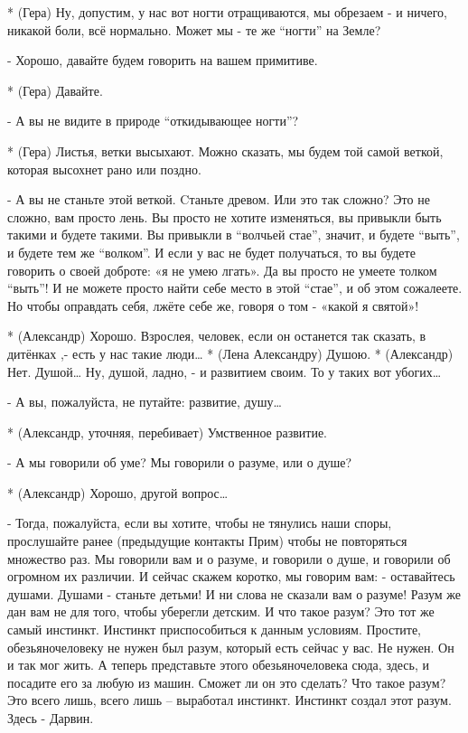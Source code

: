 * (Гера) Ну, допустим, у нас вот ногти отращиваются, мы обрезаем - и ничего, никакой боли, всё нормально. Может мы  - те же “ногти” на Земле?

- Хорошо, давайте будем говорить на вашем примитиве.

* (Гера) Давайте.

- А вы не видите в природе “откидывающее ногти”?

* (Гера) Листья, ветки высыхают. Можно сказать, мы будем той самой веткой, которая высохнет рано или поздно.

- А вы не станьте этой веткой. Cтаньте древом. Или это так сложно? Это не сложно, вам просто лень. Вы просто не хотите изменяться, вы привыкли быть такими и будете такими. Вы привыкли в “волчьей стае”, значит, и будете “выть”, и будете тем же “волком”. И если у вас не будет получаться, то вы будете говорить о своей доброте: «я не умею лгать». Да вы просто не умеете толком “выть”! И не можете просто найти себе место в этой “стае”, и об этом сожалеете. Но чтобы оправдать себя, лжёте себе же, говоря о том - «какой я святой»!

* (Александр)  Хорошо. Взрослея, человек, если он останется так сказать, в дитёнках ,- есть у нас такие люди…
* (Лена Александру) Душою.
* (Александр)  Нет. Душой… Ну, душой, ладно, - и развитием своим. То у таких вот убогих…

- А вы, пожалуйста, не путайте: развитие, душу…

* (Александр, уточняя, перебивает) Умственное развитие.

- А мы говорили об уме? Мы говорили о разуме, или о душе?

* (Александр) Хорошо, другой вопрос…

- Тогда, пожалуйста, если вы хотите, чтобы не тянулись наши споры, прослушайте ранее (предыдущие контакты Прим) чтобы не повторяться  множество раз. Мы говорили вам и о разуме, и говорили о душе, и говорили об огромном их различии. И сейчас скажем коротко, мы говорим вам: - оставайтесь душами. Душами - станьте детьми! И ни слова не сказали вам о разуме! Разум же дан вам не для того, чтобы уберегли детским. И что такое разум? Это тот же самый инстинкт. Инстинкт приспособиться к данным условиям. Простите, обезьяночеловеку не нужен был разум, который есть сейчас у вас. Не нужен. Он и так мог жить. А теперь представьте этого обезьяночеловека сюда, здесь, и посадите его за любую из машин. Сможет ли он это сделать? Что такое разум? Это всего лишь, всего лишь – выработал инстинкт. Инстинкт создал этот разум. Здесь - Дарвин. 

